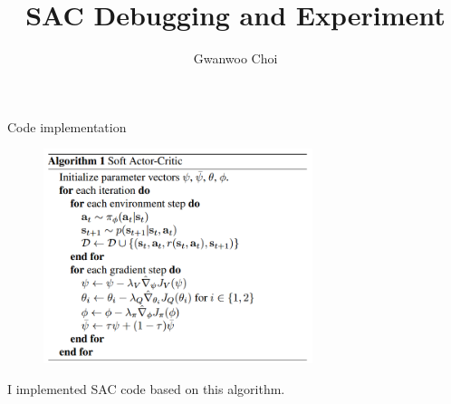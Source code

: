 \documentclass[8pt]{beamer}
\title{SAC Debugging and Experiment}
\author{Gwanwoo Choi}
\begin{document}
\begin{frame}
    \titlepage
\end{frame}





\begin{frame}{Code implementation}
    \begin{figure}
        \centering
        \includegraphics[width=0.7\textwidth]{fig6.png}
    \end{figure}

    I implemented SAC code based on this algorithm.
\end{frame}


\end{document}
